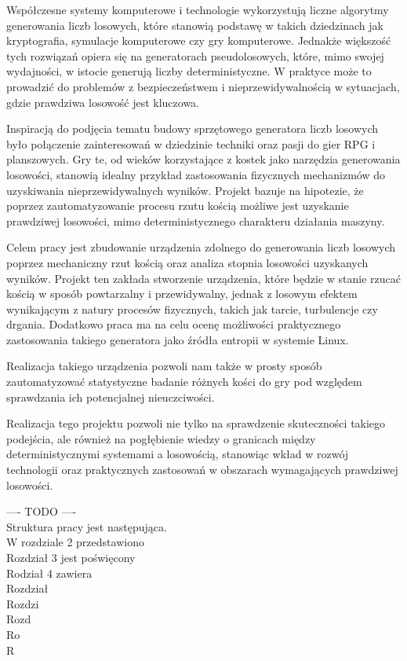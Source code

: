 Współczesne systemy komputerowe i technologie wykorzystują liczne algorytmy generowania liczb losowych, które stanowią podstawę w takich dziedzinach jak kryptografia,
symulacje komputerowe czy gry komputerowe.
Jednakże większość tych rozwiązań opiera się na generatorach pseudolosowych,
które, mimo swojej wydajności, w istocie generują liczby deterministyczne.
W praktyce może to prowadzić do problemów z bezpieczeństwem i nieprzewidywalnością w sytuacjach, gdzie prawdziwa losowość jest kluczowa.

Inspiracją do podjęcia tematu budowy sprzętowego generatora liczb losowych było połączenie zainteresowań w dziedzinie techniki oraz pasji do gier RPG i planszowych.
Gry te, od wieków korzystające z kostek jako narzędzia generowania losowości, stanowią idealny przykład zastosowania fizycznych mechanizmów do uzyskiwania nieprzewidywalnych wyników.
Projekt bazuje na hipotezie, że poprzez zautomatyzowanie procesu rzutu kością możliwe jest uzyskanie prawdziwej losowości, mimo deterministycznego charakteru działania maszyny.

Celem pracy jest zbudowanie urządzenia zdolnego do generowania liczb losowych poprzez mechaniczny rzut kością oraz analiza stopnia losowości uzyskanych wyników.
Projekt ten zakłada stworzenie urządzenia, które będzie w stanie rzucać kością w sposób powtarzalny i przewidywalny,
jednak z losowym efektem wynikającym z natury procesów fizycznych, takich jak tarcie, turbulencje czy drgania.
Dodatkowo praca ma na celu ocenę możliwości praktycznego zastosowania takiego generatora jako źródła entropii w systemie Linux.

Realizacja takiego urządzenia pozwoli nam także w prosty sposób zautomatyzować statystyczne badanie różnych kości do gry pod względem sprawdzania ich potencjalnej nieuczciwości.

Realizacja tego projektu pozwoli nie tylko na sprawdzenie skuteczności takiego podejścia,
ale również na pogłębienie wiedzy o granicach między deterministycznymi systemami a losowością,
stanowiąc wkład w rozwój technologii oraz praktycznych zastosowań w obszarach wymagających prawdziwej losowości.

---- TODO ---- \\
Struktura pracy jest następująca. \\
W rozdziale 2 przedstawiono \\
Rozdział 3 jest poświęcony \\
Rodział 4 zawiera \\
Rozdział \\
Rozdzi \\
Rozd \\
Ro \\
R \\

